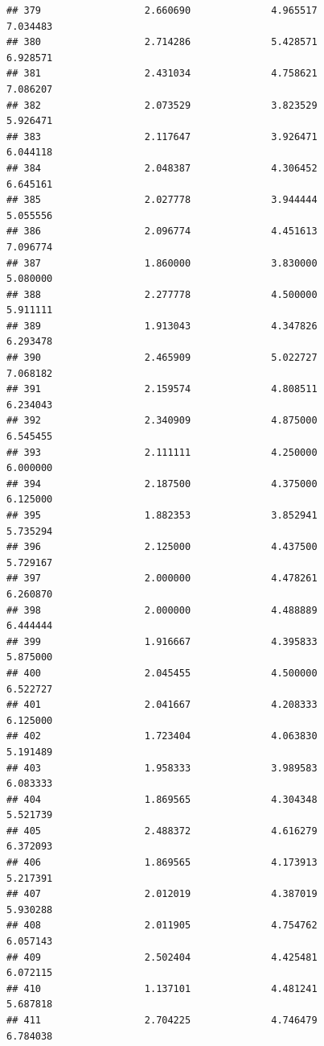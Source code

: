 \documentclass[]{article}
\begin{document}
\begin{verbatim}
## 379                  2.660690              4.965517                 7.034483
## 380                  2.714286              5.428571                 6.928571
## 381                  2.431034              4.758621                 7.086207
## 382                  2.073529              3.823529                 5.926471
## 383                  2.117647              3.926471                 6.044118
## 384                  2.048387              4.306452                 6.645161
## 385                  2.027778              3.944444                 5.055556
## 386                  2.096774              4.451613                 7.096774
## 387                  1.860000              3.830000                 5.080000
## 388                  2.277778              4.500000                 5.911111
## 389                  1.913043              4.347826                 6.293478
## 390                  2.465909              5.022727                 7.068182
## 391                  2.159574              4.808511                 6.234043
## 392                  2.340909              4.875000                 6.545455
## 393                  2.111111              4.250000                 6.000000
## 394                  2.187500              4.375000                 6.125000
## 395                  1.882353              3.852941                 5.735294
## 396                  2.125000              4.437500                 5.729167
## 397                  2.000000              4.478261                 6.260870
## 398                  2.000000              4.488889                 6.444444
## 399                  1.916667              4.395833                 5.875000
## 400                  2.045455              4.500000                 6.522727
## 401                  2.041667              4.208333                 6.125000
## 402                  1.723404              4.063830                 5.191489
## 403                  1.958333              3.989583                 6.083333
## 404                  1.869565              4.304348                 5.521739
## 405                  2.488372              4.616279                 6.372093
## 406                  1.869565              4.173913                 5.217391
## 407                  2.012019              4.387019                 5.930288
## 408                  2.011905              4.754762                 6.057143
## 409                  2.502404              4.425481                 6.072115
## 410                  1.137101              4.481241                 5.687818
## 411                  2.704225              4.746479                 6.784038

\end{verbatim}
\end{document}

